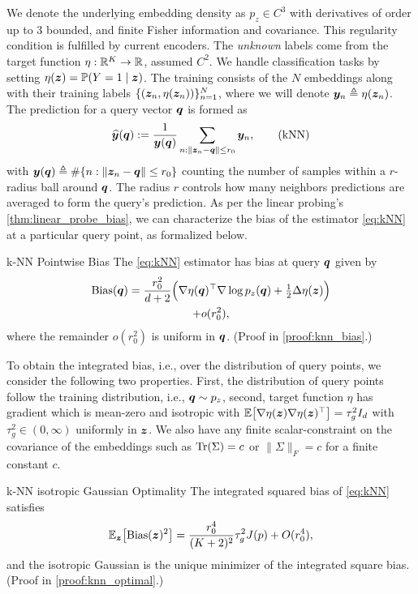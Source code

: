 We denote the underlying embedding density as $p_{z}\in C^3$ with derivatives of order up to $3$ bounded, and finite Fisher information and covariance. This regularity condition is fulfilled by current encoders. The {\em unknown} labels come from the target function $\eta:\mathbb{R}^K\to\mathbb{R}$, assumed $C^2$. We handle classification tasks by setting $\eta({\bm{z}})=\mathbb{P}(Y=1\mid {\bm{z}})$. The training consists of the $N$ embeddings along with their training labels $\{({\bm{z}}_n,\eta({\bm{z}}_n))\}_{n=1}^{N}$, where we will denote ${\bm{y}}_{n}\triangleq \eta({\bm{z}}_n)$. The prediction for a query vector ${\bm{q}}$ is formed as
\begin{align}
\widehat{{\bm{y}}}({\bm{q}})
:=
\frac{1}{{\bm{y}}({\bm{q}})}\sum_{n:\left\lVert {\bm{z}}_{n}-{\bm{q}}\right\rVert\le r_0}{\bm{y}}_n,\tag{kNN}\label{eq:kNN}
\end{align}
with ${\bm{y}}({\bm{q}})\triangleq\#\{n:\left\lVert {\bm{z}}_{n}-{\bm{q}}\right\rVert\le r_0\}$ counting the number of samples within a $r$-radius ball around ${\bm{q}}$. The radius $r$ controls how many neighbors predictions are averaged to form the query's prediction. As per the linear probing's \cref{thm:linear_probe_bias}, we can characterize the bias of the estimator \cref{eq:kNN} at a particular query point, as formalized below.




\begin{lemma}[label={thm:knn_bias}]{k-NN Pointwise Bias}{}
The \eqref{eq:kNN} estimator has bias at query ${\bm{q}}$ given by
\begin{multline*}
    \mathrm{Bias}({\bm{q}})=
\frac{r_0^2}{d+2}\Big(\nabla\eta({\bm{q}})^\top\nabla\log p_{z}({\bm{q}})+\tfrac{1}{2}\Delta\eta({\bm{z}})\Big)\\+o(r_0^2),
\end{multline*}
where the remainder $o(r_0^2)$ is uniform in ${\bm{q}}$. (Proof in \cref{proof:knn_bias}.)
\end{lemma}


To obtain the integrated bias, i.e., over the distribution of query points, we consider the following two properties. First, the distribution of query points follow the training distribution, i.e., ${\bm{q}} \sim p_{z}$, second, target function $\eta$ has gradient which is mean-zero and isotropic with $\mathbb{E}\big[\nabla\eta({\bm{z}})\nabla\eta({\bm{z}})^\top\big]=\tau_g^2I_d$ with $\tau_g^2\in(0,\infty)$
uniformly in ${\bm{z}}$. We also have any finite scalar-constraint on the covariance of the embeddings such as $\operatorname{Tr}(\Sigma)=c$ or $\|\Sigma\|_F=c$ for a finite constant $c$.



\begin{theorem}[label={thm:knn_optimal}]{k-NN isotropic Gaussian Optimality}{}
The integrated squared bias of \eqref{eq:kNN} satisfies
\[
\mathbb{E}_{{\bm{z}}}\big[\mathrm{Bias}({\bm{z}})^2\big]
=
\frac{r_0^4}{(K+2)^2}\tau_g^2J(p)\\+O(r_0^4),
\]
and the isotropic Gaussian  is the unique minimizer of the integrated square bias. (Proof in \cref{proof:knn_optimal}.)
\end{theorem}

